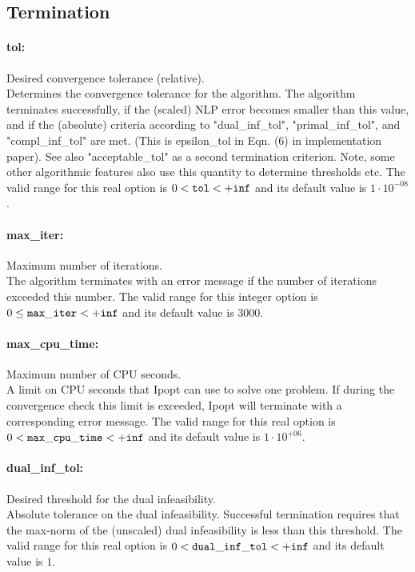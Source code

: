 \subsection{Termination}

\paragraph{tol:}\label{opt:tol} Desired convergence tolerance (relative). \\
 Determines the convergence tolerance for the algorithm.  The algorithm terminates successfully, if the (scaled) NLP error becomes smaller than this value, and if the (absolute) criteria according to "dual\_inf\_tol", "primal\_inf\_tol", and "compl\_inf\_tol" are met.  (This is epsilon\_tol in Eqn. (6) in implementation paper).  See also "acceptable\_tol" as a second termination criterion.  Note, some other algorithmic features also use this quantity to determine thresholds etc. The valid range for this real option is 
$0 <  {\tt tol } <  {\tt +inf}$
and its default value is $1 \cdot 10^{-08}$.


\paragraph{max\_iter:}\label{opt:max_iter} Maximum number of iterations. \\
 The algorithm terminates with an error message if the number of iterations exceeded this number. The valid range for this integer option is
$0 \le {\tt max\_iter } <  {\tt +inf}$
and its default value is $3000$.


\paragraph{max\_cpu\_time:}\label{opt:max_cpu_time} Maximum number of CPU seconds. \\
 A limit on CPU seconds that Ipopt can use to solve one problem.  If during the convergence check this limit is exceeded, Ipopt will terminate with a corresponding error message. The valid range for this real option is 
$0 <  {\tt max\_cpu\_time } <  {\tt +inf}$
and its default value is $1 \cdot 10^{+06}$.


\paragraph{dual\_inf\_tol:}\label{opt:dual_inf_tol} Desired threshold for the dual infeasibility. \\
 Absolute tolerance on the dual infeasibility. Successful termination requires that the max-norm of the (unscaled) dual infeasibility is less than this threshold. The valid range for this real option is 
$0 <  {\tt dual\_inf\_tol } <  {\tt +inf}$
and its default value is $1$.



